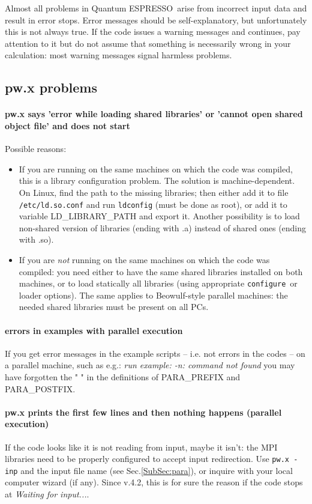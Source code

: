 \documentclass[12pt,a4paper]{article}
\def\qe{{\sc Quantum ESPRESSO}}
\def\configure{\texttt{configure}}
\begin{document}
Almost all problems in \qe\ arise from incorrect input data 
and result in
error stops. Error messages should be self-explanatory, but unfortunately
this is not always true. If the code issues a warning messages and continues,
pay attention to it but do not assume that something is necessarily wrong in
your calculation: most warning messages signal harmless problems.

\subsection{pw.x problems}

\paragraph{pw.x says 'error while loading shared libraries' or
  'cannot open shared object file' and does not start} 
Possible reasons:
\begin{itemize}
\item If you are running on the same machines on which the code was
  compiled, this is a library configuration problem. The solution is
  machine-dependent. On Linux, find the path to the missing libraries;
  then either add it to file \texttt{/etc/ld.so.conf} and run \texttt{ldconfig}
   (must be
  done as root), or add it to variable LD\_LIBRARY\_PATH and export
  it. Another possibility is to load non-shared version of libraries
  (ending with .a)  instead of shared ones (ending with .so). 
\item If you are {\em not} running on the same machines on which the
  code was compiled: you need either to have the same shared libraries
  installed on both machines, or to load statically all libraries
  (using appropriate \configure\ or loader options). The same applies to
  Beowulf-style parallel machines: the needed shared libraries must be
  present on all PCs. 
\end{itemize}

\paragraph{errors in examples with parallel execution}

If you get error messages in the example scripts -- i.e. not errors in
the codes -- on a parallel machine, such as e.g.: 
{\em run example: -n: command not found}
you may have forgotten 
the " " in the definitions of PARA\_PREFIX and PARA\_POSTFIX.

\paragraph{pw.x prints the first few lines and then nothing happens
  (parallel execution)} 
If the code looks like it is not reading from input, maybe
it isn't: the MPI libraries need to be properly configured to accept input
redirection. Use \texttt{pw.x -inp} and the input file name (see Sec.\ref{SubSec:para}), or inquire with
your local computer wizard (if any). Since v.4.2, this is for sure the
reason if the code stops at {\em Waiting for input...}.
\end{document}
